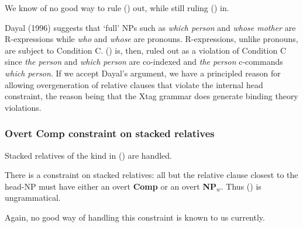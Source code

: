 
We know of no good way to rule () out, while still ruling () in.

Dayal (1996) suggests that `full' NPs such as {\em which person} and
{\em whose mother} are R-expressions while {\em who} and {\em whose}
are pronouns. R-expressions, unlike pronouns, are subject to Condition C.
() is, then, ruled out as a violation of Condition C since {\em 
the person} and {\em which person} are co-indexed and {\em the person}
c-commands {\em which person}. If we accept Dayal's argument, we 
have a principled reason for allowing overgeneration of relative clauses
that violate the internal head constraint, the reason being that 
the Xtag grammar does generate binding theory violations.

\subsubsection{Overt Comp constraint on stacked relatives}
Stacked relatives of the kind in () are handled.


There is a constraint on stacked relatives: all but the relative clause
closest to the head-NP must have either an overt {\bf Comp} or 
an overt {\bf NP$_{w}$}. Thus () is ungrammatical.


Again, no good way of handling this constraint is known to us 
currently. 
